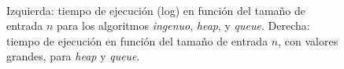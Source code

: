 \begin{figure}[!htbp]
    $\ \ \ \ $

    \caption{Izquierda: tiempo de ejecución (log) en función del tamaño de entrada $n$ para los algoritmos \textit{ingenuo}, \textit{heap}, y \textit{queue}. Derecha: tiempo de ejecución en función del tamaño de entrada $n$, con valores grandes, para \textit{heap} y \textit{queue}.}
    \label{grafico_2}
\end{figure}

